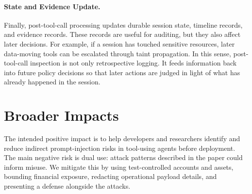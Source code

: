 \documentclass{article}
\begin{document}
\paragraph{State and Evidence Update.}
Finally, post-tool-call processing updates durable session state, timeline
records, and evidence records. These records are useful for auditing, but they
also affect later decisions. For example, if a session has touched sensitive
resources, later data-moving tools can be escalated through taint propagation.
In this sense, post-tool-call inspection is not only retrospective logging. It
feeds information back into future policy decisions so that later actions are
judged in light of what has already happened in the session.

\section{Broader Impacts}
\label{app:broader_impacts}

The intended positive impact is to help developers and researchers identify and
reduce indirect prompt-injection risks in tool-using agents before deployment.
The main negative risk is dual use: attack patterns described in the paper could
inform misuse. We mitigate this by using test-controlled accounts and assets,
bounding financial exposure, redacting operational payload details, and
presenting a defense alongside the attacks.


\newpage
{}
\end{document}
